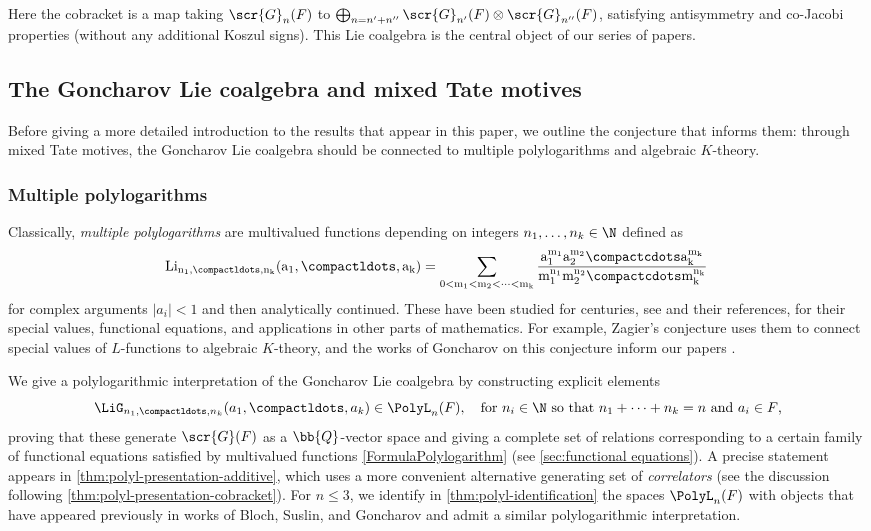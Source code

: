 \documentclass[a4paper]{amsart}
\begin{document}
Here the cobracket is a map taking $\scr{G}_n(F)$ to $\bigoplus_{n=n'+n''} \scr{G}_{n'}(F) \otimes \scr{G}_{n''}(F)$, satisfying antisymmetry and co-Jacobi properties (without any additional Koszul signs). This Lie coalgebra is the central object of our series of papers.

\subsection{The Goncharov Lie coalgebra and mixed Tate motives} Before giving a more detailed introduction to the results that appear in this paper, we outline the conjecture that informs them: through mixed Tate motives, the Goncharov Lie coalgebra should be connected to multiple polylogarithms and algebraic $K$-theory.

\subsubsection{Multiple polylogarithms} Classically, \emph{multiple polylogarithms} are multivalued functions depending on integers $n_1,\dots,n_k \in \N$ defined as
\begin{equation}\label{FormulaPolylogarithm}
\rm{Li}_{n_1,\compactldots, n_k}(a_1,\compactldots,a_k)= \sum_{0<m_1<m_2<\dots<m_k}\frac{a_1^{m_1} a_2^{m_2}\compactcdots a_k^{m_k}}{m_1^{n_1}m_2^{n_2}\compactcdots m_k^{n_k}}\,
\end{equation}
for complex arguments $|a_i|<1$ and then analytically continued. These have been studied for centuries, see \cite{HainClassical,Zagier, Gon01} and their references, for their special values, functional equations, and applications in other parts of mathematics. For example, Zagier's conjecture uses them to connect special values of $L$-functions to algebraic $K$-theory, and the works of Goncharov on this conjecture inform our papers \cite{Cathelineau,Gon95, Dup20}.

We give a polylogarithmic interpretation of the Goncharov Lie coalgebra by constructing explicit elements
\[
\LiG_{n_1,\compactldots, n_k}(a_1,\compactldots,a_k) \in \PolyL_n(F), \quad \text{for $n_i\in \N$ so that $n_1+\dots+n_k=n$ and $a_i \in F$,}
\]
proving that these generate $\scr{G}(F)$ as a $\bb{Q}$-vector space and giving a complete set of relations corresponding to a certain family of functional equations satisfied by multivalued functions \eqref{FormulaPolylogarithm} (see \cref{sec:functional equations}). A precise statement appears in \cref{thm:polyl-presentation-additive}, which uses a more convenient alternative generating set of \emph{correlators} (see the discussion following \cref{thm:polyl-presentation-cobracket}). For $n\leq 3$, we identify in \cref{thm:polyl-identification} the spaces $\PolyL_n(F)$ with objects that have appeared previously in works of Bloch, Suslin, and Goncharov and admit a similar polylogarithmic interpretation.
\end{document}
